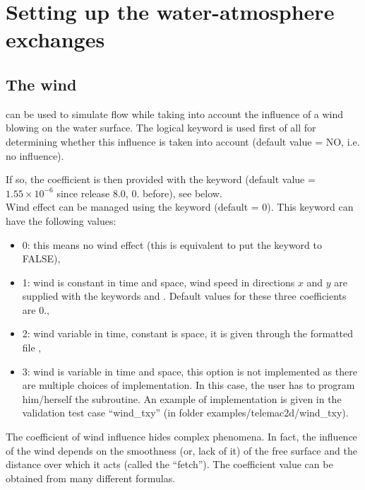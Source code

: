 \section{Setting up the water-atmosphere exchanges}

\subsection{The wind}

 can be used to simulate flow while taking into account the influence
of a wind blowing on the water surface. The logical keyword  is
used first of all for determining whether this influence is taken into account
(default value = NO, i.e. no influence).

If so, the coefficient is then provided with the keyword
 (default value =
$1.55 \times 10^{-6}$ since release 8.0, 0. before), see below.\\

Wind effect can be managed using the keyword 
(default = 0). This keyword can have the following values:

\begin{itemize}
\item 0: this means no wind effect (this is equivalent to put the keyword
 to FALSE),

\item 1: wind is constant in time and space, wind speed in directions $x$ and $y$
are supplied with the keywords  and
.
Default values for these three coefficients are 0.,

\item 2: wind variable in time, constant is space, it is given through
the formatted file ,

\item 3: wind is variable in time and space,
this option is not implemented as there are multiple choices of implementation.
In this case, the user has to program him/herself the  subroutine.
An example of implementation is given in the  validation test case
``wind\_txy'' (in folder examples/telemac2d/wind\_txy).
\end{itemize}

The coefficient of wind influence hides complex phenomena. In fact, the
influence of the wind depends on the smoothness (or, lack of it) of the free
surface and the distance over which it acts (called the ``fetch''). The
coefficient value can be obtained from many different formulas.

